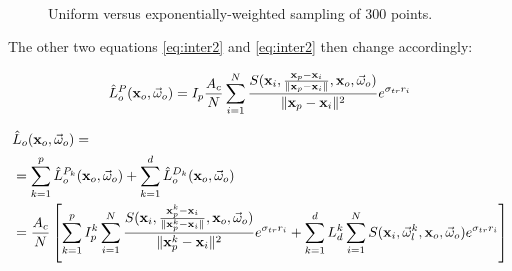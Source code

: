 \begin{figure}
\centering
{}
 \\
\caption{Uniform versus exponentially-weighted sampling of 300 points.}
\label{fig:samplingweight}
\end{figure}

The other two equations \ref{eq:inter2} and \ref{eq:inter2} then change accordingly:

$$
\hat{L}_o^P(\mathbf{x}_o,\vec{\omega}_o) = I_p \frac{A_c}{N} \sum_{i = 1}^N \frac{S(\mathbf{x}_i, \frac{\mathbf{x}_p - \mathbf{x}_i}{\|\mathbf{x}_p - \mathbf{x}_i\|}, \mathbf{x}_o, \vec{\omega}_o)}{\|\mathbf{x}_p - \mathbf{x}_i\|^2}  e^{\sigma_{tr} r_i}
$$

\begin{equation*}
\begin{split}
&\hat{L}_o(\mathbf{x}_o,\vec{\omega}_o) = \\
&= \sum_{k=1}^{p}\hat{L}_o^{P_k}(\mathbf{x}_o,\vec{\omega}_o) + \sum_{k=1}^{d}\hat{L}_o^{D_k}(\mathbf{x}_o,\vec{\omega}_o) \\
&= \frac{A_c}{N} \left[ \sum_{k=1}^{p}I_p^k \sum_{i = 1}^N \frac{S(\mathbf{x}_i, \frac{\mathbf{x}_p^k - \mathbf{x}_i}{\|\mathbf{x}_p^k - \mathbf{x}_i\|}, \mathbf{x}_o, \vec{\omega}_o)}{\|\mathbf{x}_p^k - \mathbf{x}_i\|^2} e^{\sigma_{tr} r_i} + \sum_{k=1}^{d} L_d^k \sum_{i = 1}^N S(\mathbf{x}_i, \vec{\omega}^k_l, \mathbf{x}_o, \vec{\omega}_o) e^{\sigma_{tr} r_i}\right] 
\end{split}
\end{equation*}

